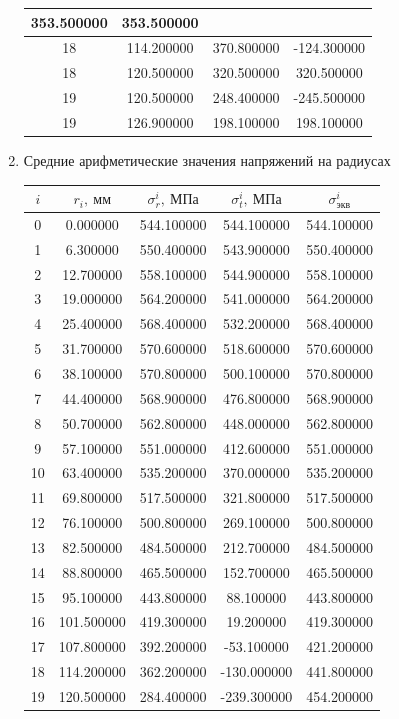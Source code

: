 \documentclass[a4paper,10pt]{article}
\begin{document}
\begin{enumerate}
\begin{center}
\begin{tabular}{|c|c|c|c|}
353.500000 & 353.500000 \\ \hline 18 & 114.200000 & 370.800000 & -124.300000 \\ \hline 18 & 120.500000 & 320.500000 & 320.500000 \\ \hline 19 & 120.500000 & 248.400000 & -245.500000 \\ \hline 19 & 126.900000 & 198.100000 & 198.100000 \\ \hline 
\end{tabular} 
\end{center}

\item Средние арифметические значения напряжений на радиусах

\begin{center}
\begin{tabular}{|c|c|c|c|c|}
\hline 
$i$ & $r_i,\ мм$ & $\sigma_r^{i},\ МПа$ & $\sigma_t^{i},\ МПа$ & $\sigma_{экв}^i$ \\ 
\hline 
0 & 0.000000 & 544.100000 & 544.100000 & 544.100000 \\ \hline 1 & 6.300000 & 550.400000 & 543.900000 & 550.400000 \\ \hline 2 & 12.700000 & 558.100000 & 544.900000 & 558.100000 \\ \hline 3 & 19.000000 & 564.200000 & 541.000000 & 564.200000 \\ \hline 4 & 25.400000 & 568.400000 & 532.200000 & 568.400000 \\ \hline 5 & 31.700000 & 570.600000 & 518.600000 & 570.600000 \\ \hline 6 & 38.100000 & 570.800000 & 500.100000 & 570.800000 \\ \hline 7 & 44.400000 & 568.900000 & 476.800000 & 568.900000 \\ \hline 8 & 50.700000 & 562.800000 & 448.000000 & 562.800000 \\ \hline 9 & 57.100000 & 551.000000 & 412.600000 & 551.000000 \\ \hline 10 & 63.400000 & 535.200000 & 370.000000 & 535.200000 \\ \hline 11 & 69.800000 & 517.500000 & 321.800000 & 517.500000 \\ \hline 12 & 76.100000 & 500.800000 & 269.100000 & 500.800000 \\ \hline 13 & 82.500000 & 484.500000 & 212.700000 & 484.500000 \\ \hline 14 & 88.800000 & 465.500000 & 152.700000 & 465.500000 \\ \hline 15 & 95.100000 & 443.800000 & 88.100000 & 443.800000 \\ \hline 16 & 101.500000 & 419.300000 & 19.200000 & 419.300000 \\ \hline 17 & 107.800000 & 392.200000 & -53.100000 & 421.200000 \\ \hline 18 & 114.200000 & 362.200000 & -130.000000 & 441.800000 \\ \hline 19 & 120.500000 & 284.400000 & -239.300000 & 454.200000 \\ \hline 
\end{tabular} 
\end{center}


\end{enumerate}
\end{document}
